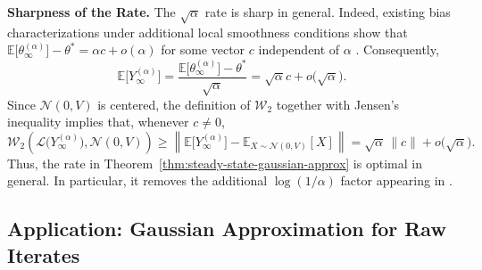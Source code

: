 \documentclass[11pt,letterpaper]{article}
\theoremstyle{plain}
\theoremstyle{definition}
\theoremstyle{remark}
\newcommand{\E}{\mathbb{E}}
\newcommand{\W}{\mathcal{W}}
\newcommand{\law}{\mathcal{L}}
\begin{document}
\noindent\textbf{Sharpness of the Rate.}
The \(\sqrt{\alpha}\) rate is sharp in general.
Indeed, existing bias characterizations under additional local smoothness
conditions show that $\E\bigl[\theta_\infty^{(\alpha)}\bigr]-\theta^*
    =
    \alpha c+o(\alpha)$ for some vector $c$ independent of $\alpha$ \citep{dieuleveut2020bridging,zhang2024constant,huo2024collusion,zhang2025piecewise}. Consequently,
\[
    \E\bigl[Y_\infty^{(\alpha)}\bigr]
    =
    \frac{
        \E\bigl[\theta_\infty^{(\alpha)}\bigr]-\theta^*
    }{\sqrt{\alpha}}
    =
    \sqrt{\alpha}c+o\bigl(\sqrt{\alpha}\bigr).
\]
Since $\mathcal N(0,V)$ is centered, the definition of $\W_2$ together with
Jensen's inequality implies that, whenever $c\neq 0$,
\[
    \W_2\!\left(
        \law\bigl(Y_\infty^{(\alpha)}\bigr),
        \mathcal N(0,V)
    \right)
    \geq
    \left\|
        \E\bigl[Y_\infty^{(\alpha)}\bigr]
        -
        \E_{X\sim\mathcal N(0,V)}[X]
    \right\|
    =
    \sqrt{\alpha}\,\|c\|
    +
    o\bigl(\sqrt{\alpha}\bigr).
\]
Thus, the rate in
Theorem~\ref{thm:steady-state-gaussian-approx} is optimal in general. In
particular, it removes the additional \(\log(1/\alpha)\) factor appearing in
\cite{wang2026steady}. 


\subsection{Application: Gaussian Approximation for Raw Iterates}
\label{sec:raw-gaussian}
\end{document}
